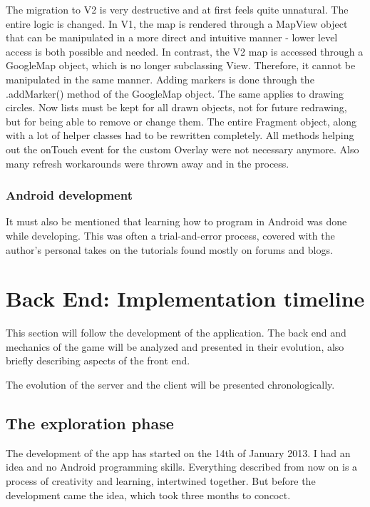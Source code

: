 \documentclass{article}
\begin{document}
The migration to V2 is very destructive and at first feels quite unnatural. The
entire logic is changed. In V1, the map is rendered through a MapView object
that can be manipulated in a more direct and intuitive manner - lower level
access is both possible and needed. In contrast, the V2 map is accessed through
a GoogleMap object, which is no longer subclassing View. Therefore, it cannot be
manipulated in the same manner. Adding markers is done through the .addMarker()
method of the GoogleMap object. The same applies to drawing circles. Now lists
must be kept for all drawn objects, not for future redrawing, but for being able
to remove or change them. The entire Fragment object, along with a lot of
helper classes had to be rewritten completely. All methods helping out the
onTouch event for the custom Overlay were not necessary anymore. Also many
refresh workarounds were thrown away and in the process.

\subsubsection{Android development}

It must also be mentioned that learning how to program in Android was done while
developing. This was often a trial-and-error process, covered with the
author's personal takes on the tutorials found mostly on forums and blogs.


\section{Back End: Implementation timeline}

This section will follow the development of the application. The back end and
mechanics of the game will be analyzed and presented in their evolution,
also briefly describing aspects of the front end. \newline

The evolution of the server and the client will be presented chronologically.

\subsection{The exploration phase}

The development of the app has started on the 14th of January 2013. I had an
idea and no Android programming skills. Everything described from now on is a
process of creativity and learning, intertwined together. But before the
development came the idea, which took three months to concoct.\newline
\end{document}
